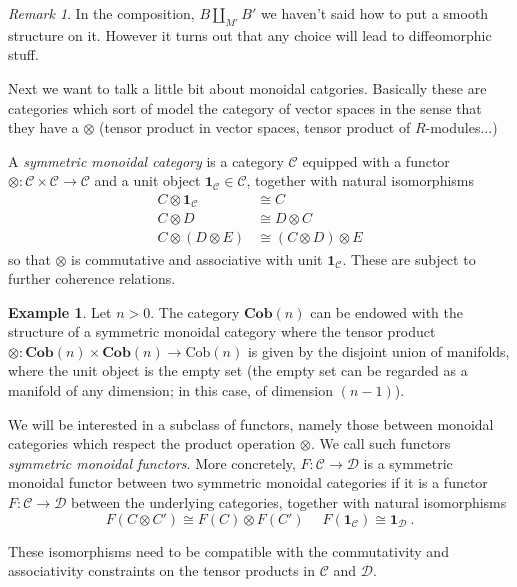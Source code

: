 \documentclass[a4paper,11pt]{article}
\newcommand{\ccal}{\mathcal{C}}
\newcommand{\dcal}{\mathcal{D}}
\theoremstyle{plain}
\theoremstyle{definition}
\newtheorem{ej}[thm]{Example}
\theoremstyle{remark}
\newtheorem*{rem}{Remark}
\begin{document}
\begin{rem}
In the composition, $B \coprod_{M'} B'$ we haven't said how to put a smooth structure on it. However it turns out that any choice will lead to diffeomorphic stuff. 
\end{rem}

Next we want to talk a little bit about monoidal catgories. Basically these are categories which sort of model the category of vector spaces in the sense that they have a  $\otimes$ (tensor product in vector spaces, tensor product of $R$-modules...)

A \textit{symmetric monoidal category} is a category $\ccal$ equipped with a functor $\otimes \colon \ccal \times \ccal \to \ccal$ and a unit object $\mathbf{1}_{\ccal} \in \ccal$, together with natural isomorphisms 
\begin{align*}
    C \otimes \mathbf{1}_{\ccal} & \cong  C\\
    C \otimes D & \cong D \otimes C\\
    C \otimes (D \otimes E)& \cong ( C \otimes D) \otimes E
\end{align*}
so that $\otimes$ is commutative and associative with unit $\mathbf{1}_{\ccal}$. These are subject to further coherence relations.

\begin{ej}
Let $n >0 $. The category $\textbf{Cob}(n)$ can be endowed with the structure of a symmetric monoidal category where the tensor product $\otimes \colon \textbf{Cob}(n) \times \textbf{Cob}(n) \to \text{Cob}(n)$ is given by the disjoint union of manifolds, where the unit object is the empty set (the empty set can be regarded as a manifold of any dimension; in this case, of dimension $(n-1)$). 
\end{ej}


We will be interested in a subclass of functors, namely those between monoidal categories which respect the product operation $\otimes$. We call such functors \textit{symmetric monoidal functors}. More concretely, $F \colon \ccal \to \dcal$ is a symmetric monoidal functor between two symmetric monoidal categories if it is a functor $F \colon \ccal \to \dcal$ between the underlying categories, together with natural isomorphisms 
$$F(C \otimes C') \cong F(C) \otimes F(C') \; \quad F(\mathbf{1}_{\ccal}) \cong \mathbf{1}_{\dcal} \ .$$

These isomorphisms need to be compatible with the commutativity and associativity constraints on the tensor products in $\ccal$ and $\dcal$. 
\end{document}
